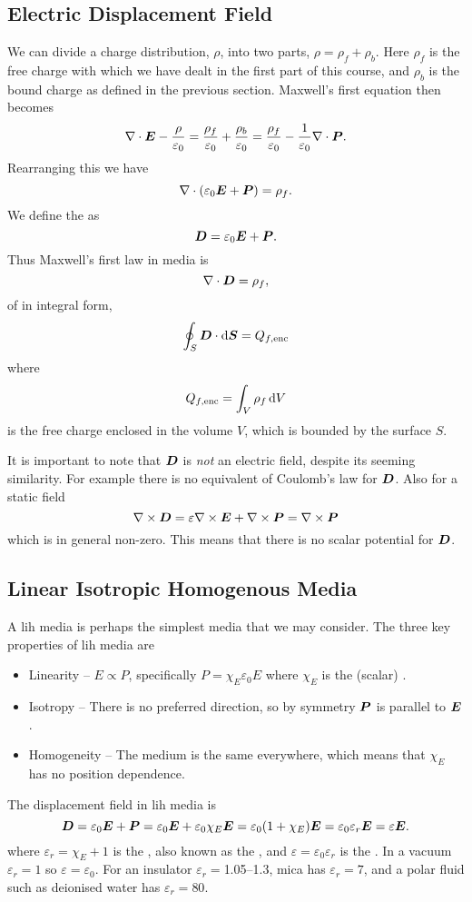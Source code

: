     \subsection{Electric Displacement Field}
    We can divide a charge distribution, \(\rho\), into two parts, \(\rho = \rho_f + \rho_b\).
    Here \(\rho_f\) is the free charge with which we have dealt in the first part of this course, and \(\rho_b\) is the bound charge as defined in the previous section.
    Maxwell's first equation then becomes
    \[\nabla\cdot\bm{E} - \frac{\rho}{\varepsilon_0} = \frac{\rho_f}{\varepsilon_0} + \frac{\rho_b}{\varepsilon_0} = \frac{\rho_f}{\varepsilon_0} - \frac{1}{\varepsilon_0}\nabla\cdot\bm{P}.\]
    Rearranging this we have
    \[\nabla\cdot(\varepsilon_0\bm{E} + \bm{P}) = \rho_f.\]
    We define the  as
    \[\bm{D} = \varepsilon_0\bm{E} + \bm{P}.\]
    Thus Maxwell's first law in media is
    \[\nabla\cdot\bm{D} = \rho_f,\]
    of in integral form,
    \[\oint_S \bm{D}\cdot\dd{\bm{S}} = Q_{f,{\mathrm{enc}}}\]
    where
    \[Q_{f,{\mathrm{enc}}} = \int_V \rho_f\dd{V}\]
    is the free charge enclosed in the volume \(V\), which is bounded by the surface \(S\).
    
    It is important to note that \(\bm{D}\) is \emph{not} an electric field, despite its seeming similarity.
    For example there is no equivalent of Coulomb's law for \(\bm{D}\).
    Also for a static field
    \[\nabla\times\bm{D} = \varepsilon\nabla\times\bm{E} + \nabla\times\bm{P} = \nabla\times\bm{P}\]
    which is in general non-zero.
    This means that there is no scalar potential for \(\bm{D}\).
    
    \subsection{Linear Isotropic Homogenous Media}
    A \gls{lih} media is perhaps the simplest media that we may consider.
    The three key properties of \gls{lih} media are
    \begin{itemize}
        \item Linearity -- \(E\propto P\), specifically \(P = \chi_E\varepsilon_0E\) where \(\chi_E\) is the (scalar) .
        \item Isotropy -- There is no preferred direction, so by symmetry \(\bm{P}\) is parallel to \(\bm{E}\).
        \item Homogeneity -- The medium is the same everywhere, which means that \(\chi_E\) has no position dependence.
    \end{itemize}
    The displacement field in \gls{lih} media is
    \[\bm{D} = \varepsilon_0\bm{E} + \bm{P} = \varepsilon_0\bm{E} + \varepsilon_0\chi_E\bm{E} =  \varepsilon_0(1 + \chi_E)\bm{E} = \varepsilon_0\varepsilon_r\bm{E} = \varepsilon\bm{E}.\]
    where \(\varepsilon_r = \chi_E + 1\) is the , also known as the , and \(\varepsilon = \varepsilon_0\varepsilon_r\) is the .
    In a vacuum \(\varepsilon_r = 1\) so \(\varepsilon = \varepsilon_0\).
    For an insulator \(\varepsilon_r = \)\SIrange{1.05}{1.3}{}, mica has \(\varepsilon_r = 7\), and a polar fluid such as deionised water has \(\varepsilon_r = 80\).
    
